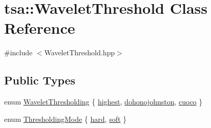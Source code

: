 \hypertarget{classtsa_1_1_wavelet_threshold}{}\section{tsa\+:\+:Wavelet\+Threshold Class Reference}
\label{classtsa_1_1_wavelet_threshold}


{\ttfamily \#include $<$Wavelet\+Threshold.\+hpp$>$}

\subsection*{Public Types}
\begin{DoxyCompactItemize}
\item 
enum \hyperlink{classtsa_1_1_wavelet_threshold_a50c42c95dae960986a985157ca038fae}{Wavelet\+Thresholding} \{ \hyperlink{classtsa_1_1_wavelet_threshold_a50c42c95dae960986a985157ca038faea9f61564af63af2a5259667285adc8404}{highest}, 
\hyperlink{classtsa_1_1_wavelet_threshold_a50c42c95dae960986a985157ca038faea890fa411734e6128a3422faa61aff98b}{dohonojohnston}, 
\hyperlink{classtsa_1_1_wavelet_threshold_a50c42c95dae960986a985157ca038faea849b2c33799f9de0e842f1d935ea3822}{cuoco}
 \}
\item 
enum \hyperlink{classtsa_1_1_wavelet_threshold_a93d14df024bbc8c3da182bf5899f8f83}{Thresholding\+Mode} \{ \hyperlink{classtsa_1_1_wavelet_threshold_a93d14df024bbc8c3da182bf5899f8f83adddc84c6cfd6dbd73d08352618545fb3}{hard}, 
\hyperlink{classtsa_1_1_wavelet_threshold_a93d14df024bbc8c3da182bf5899f8f83a356244854a142af0e9f3db2cf4ad5192}{soft}
 \}
\end{DoxyCompactItemize}
